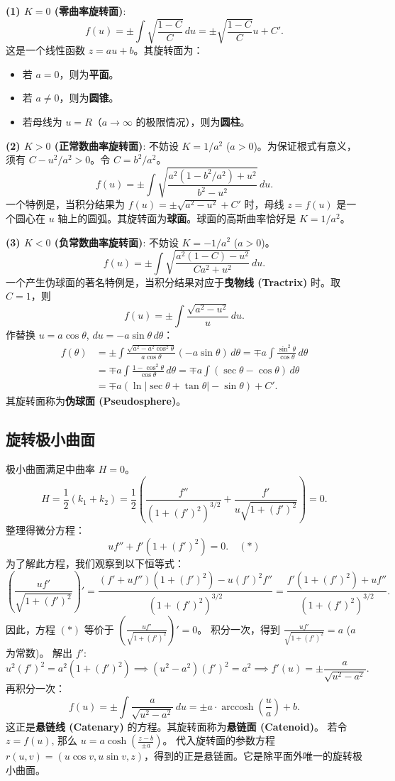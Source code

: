 \documentclass[lang=cn,10pt,thmcnt=section]{elegantbook}
\begin{document}
\textbf{(1) $K=0$ (零曲率旋转面)}:
\[ f(u) = \pm \int \sqrt{\frac{1-C}{C}} \, du = \pm \sqrt{\frac{1-C}{C}} u + C'. \]
这是一个线性函数 $z=au+b$。其旋转面为：
\begin{itemize}
    \item 若 $a=0$，则为\textbf{平面}。
    \item 若 $a \neq 0$，则为\textbf{圆锥}。
    \item 若母线为 $u=R$（$a \to \infty$ 的极限情况），则为\textbf{圆柱}。
\end{itemize}

\textbf{(2) $K > 0$ (正常数曲率旋转面)}:
不妨设 $K = 1/a^2$ ($a>0$)。为保证根式有意义，须有 $C - u^2/a^2 > 0$。令 $C=b^2/a^2$。
\[ f(u) = \pm \int \sqrt{\frac{a^2(1-b^2/a^2)+u^2}{b^2-u^2}} \, du. \]
一个特例是，当积分结果为 $f(u) = \pm \sqrt{a^2-u^2} + C'$ 时，母线 $z=f(u)$ 是一个圆心在 $u$ 轴上的圆弧。其旋转面为\textbf{球面}。球面的高斯曲率恰好是 $K=1/a^2$。

\textbf{(3) $K < 0$ (负常数曲率旋转面)}:
不妨设 $K = -1/a^2$ ($a>0$)。
\[ f(u) = \pm \int \sqrt{\frac{a^2(1-C)-u^2}{Ca^2+u^2}} \, du. \]
一个产生伪球面的著名特例是，当积分结果对应于\textbf{曳物线 (Tractrix)} 时。取 $C=1$，则
\[ f(u) = \pm \int \frac{\sqrt{a^2 - u^2}}{u} \, du. \]
作替换 $u = a \cos \theta$, $du = -a \sin \theta \, d\theta$：
\begin{align*}
    f(\theta) &= \pm \int \frac{\sqrt{a^2 - a^2\cos^2\theta}}{a\cos\theta}(-a\sin\theta) \, d\theta = \mp a \int \frac{\sin^2\theta}{\cos\theta} \, d\theta \\
    &= \mp a \int \frac{1-\cos^2\theta}{\cos\theta} \, d\theta = \mp a \int (\sec\theta - \cos\theta) \, d\theta \\
    &= \mp a (\ln|\sec\theta + \tan\theta| - \sin\theta) + C'.
\end{align*}
其旋转面称为\textbf{伪球面 (Pseudosphere)}。
\subsection{旋转极小曲面}
极小曲面满足中曲率 $H=0$。
\[
H = \frac{1}{2}(k_1 + k_2) = \frac{1}{2} \left( \frac{f''}{(1 + (f')^2)^{3/2}} + \frac{f'}{u \sqrt{1 + (f')^2}} \right) = 0.
\]
整理得微分方程：
\[
u f'' + f'(1 + (f')^2) = 0. \quad (*)
\]
为了解此方程，我们观察到以下恒等式：
\[
\left( \frac{u f'}{\sqrt{1 + (f')^2}} \right)' = \frac{(f' + u f'')(1 + (f')^2) - u (f')^2 f''}{(1 + (f')^2)^{3/2}} = \frac{f'(1+(f')^2) + u f''}{(1+(f')^2)^{3/2}}.
\]
因此，方程 $(*)$ 等价于 $\left( \frac{u f'}{\sqrt{1 + (f')^2}} \right)' = 0$。
积分一次，得到 $\frac{u f'}{\sqrt{1 + (f')^2}} = a$ ($a$ 为常数)。
解出 $f'$:
\[
u^2 (f')^2 = a^2 (1+(f')^2) \implies (u^2-a^2)(f')^2 = a^2 \implies f'(u) = \pm \frac{a}{\sqrt{u^2-a^2}}.
\]
再积分一次：
\[
f(u) = \pm \int \frac{a}{\sqrt{u^2-a^2}} \, du = \pm a \cdot \operatorname{arccosh}\left(\frac{u}{a}\right) + b.
\]
这正是\textbf{悬链线 (Catenary)} 的方程。其旋转面称为\textbf{悬链面 (Catenoid)}。
若令 $z = f(u)$, 那么 $u = a \cosh\left(\frac{z-b}{\pm a}\right)$。
代入旋转面的参数方程 $r(u,v) = (u \cos v, u \sin v, z)$，得到的正是悬链面。它是除平面外唯一的旋转极小曲面。
\end{document}
